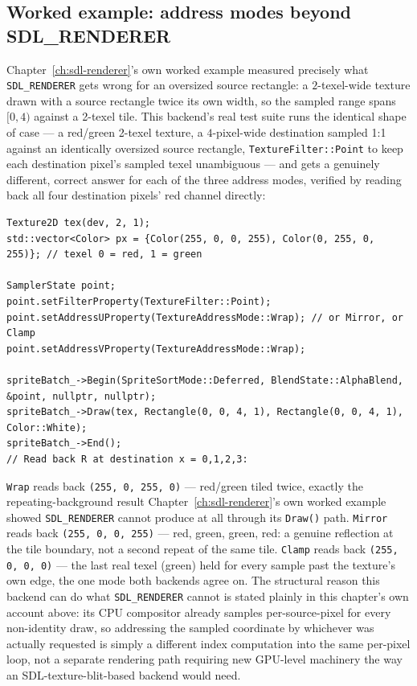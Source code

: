 \subsection{Worked example: address modes beyond SDL\_RENDERER}

Chapter~\ref{ch:sdl-renderer}'s own worked example measured precisely what
\texttt{SDL\_RENDERER} gets wrong for an oversized  source rectangle: a
$2$-texel-wide texture drawn with a source rectangle twice its own width, so the sampled range
spans $[0,4)$ against a 2-texel tile. This backend's real test suite runs the identical shape
of case --- a red/green 2-texel texture, a $4$-pixel-wide destination sampled 1:1 against an
identically oversized source rectangle, \texttt{TextureFilter::Point} to keep each destination
pixel's sampled texel unambiguous --- and gets a genuinely different, correct answer for each
of the three address modes, verified by reading back all four destination pixels' red channel
directly:

\begin{lstlisting}
Texture2D tex(dev, 2, 1);
std::vector<Color> px = {Color(255, 0, 0, 255), Color(0, 255, 0, 255)}; // texel 0 = red, 1 = green

SamplerState point;
point.setFilterProperty(TextureFilter::Point);
point.setAddressUProperty(TextureAddressMode::Wrap); // or Mirror, or Clamp
point.setAddressVProperty(TextureAddressMode::Wrap);

spriteBatch_->Begin(SpriteSortMode::Deferred, BlendState::AlphaBlend, &point, nullptr, nullptr);
spriteBatch_->Draw(tex, Rectangle(0, 0, 4, 1), Rectangle(0, 0, 4, 1), Color::White);
spriteBatch_->End();
// Read back R at destination x = 0,1,2,3:
\end{lstlisting}

\texttt{Wrap} reads back \texttt{(255, 0, 255, 0)} --- red/green tiled twice, exactly the
repeating-background result Chapter~\ref{ch:sdl-renderer}'s own worked example showed
\texttt{SDL\_RENDERER} cannot produce at all through its \texttt{Draw()} path.
\texttt{Mirror} reads back \texttt{(255, 0, 0, 255)} --- red, green, green, red: a genuine
reflection at the tile boundary, not a second repeat of the same tile.
\texttt{Clamp} reads back \texttt{(255, 0, 0, 0)} --- the last real texel (green) held for
every sample past the texture's own edge, the one mode both backends agree on. The structural
reason this backend can do what \texttt{SDL\_RENDERER} cannot is stated plainly in this
chapter's own account above: its CPU compositor already samples per-source-pixel for every
non-identity draw, so addressing the sampled coordinate by whichever
 was actually requested is simply a different index computation
into the same per-pixel loop, not a separate rendering path requiring new GPU-level machinery
the way an SDL-texture-blit-based backend would need.

